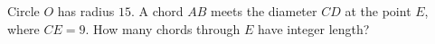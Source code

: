Circle $O$ has radius $15$. A chord $AB$ meets the diameter $CD$ at the point $E$, where $CE=9$. How many chords through $E$ have integer length?
